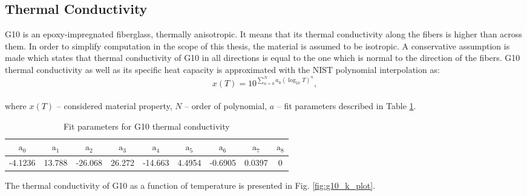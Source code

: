 
\subsection{Thermal Conductivity}
\label{subsection:thermal_conductivity_g10}

G10 is an epoxy-impregnated fiberglass, thermally anisotropic. It means that its thermal conductivity along the fibers is higher than across them. In order to simplify computation in the scope of this thesis, the material is assumed to be isotropic. A conservative assumption is made which states that thermal conductivity of G10 in all directions is equal to the one which is normal to the direction of the fibers.
G10 thermal conductivity as well as its specific heat capacity is approximated with the NIST polynomial interpolation as: 
\begin{equation}
    x(T) = 10^{\sum_{n=0}^{N} a_\text{n}(\log_\text{10}T)^{n}},
    \label{G10_polynomial_interpolation}
\end{equation}
\\
where $x(T)$ -- considered material property, $N$ -- order of polynomial, $a$ -- fit parameters described in Table \ref{table:nist_g10_k_parameters}.

\begin{table}[H]
    \caption{Fit parameters for G10 thermal conductivity} 
    \vspace{-1.em} 
    \fontsize{10}{10}
    \selectfont 
    \renewcommand{\arraystretch}{1.5}
    \begin{center}
    \begin{tabular}{ ccccccccc }  
    $\text{a}_0$ & $\text{a}_1$ & $\text{a}_2$ & $\text{a}_3$ & $\text{a}_4$ & $\text{a}_5$ & $\text{a}_6$ & $\text{a}_7$ & $\text{a}_8$ \\
    \hline
    -4.1236 & 13.788 & -26.068 & 26.272 & -14.663 & 4.4954 & -0.6905 & 0.0397 & 0 \\
    \hline 
    \end{tabular}
    \end{center}  
     \label{table:nist_g10_k_parameters} 
 \end{table}

The thermal conductivity of G10 as a function of temperature is presented in Fig. \ref{fig:g10_k_plot}.

